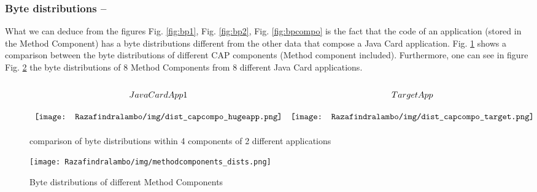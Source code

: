 \subsubsection{Byte distributions --}
What we can deduce from the figures Fig. \ref{fig:bp1}, Fig. \ref{fig:bp2}, Fig.
\ref{fig:bpcompo} is the fact that the code of an application (stored in the Method Component) has a
byte distributions different from the other data that compose a Java Card application. Fig. \ref{fig:bd1} shows a comparison between the byte distributions of different CAP
components (Method component included). Furthermore, one can see in figure Fig. \ref{fig:bd3}
the byte distributions of 8 Method Components from 8 different Java Card applications. 

\begin{figure}[!h]
\begin{center}
\[\arraycolsep=5pt\def\arraystretch{2.1}
\begin{array}{cc}
Java CardApp1 & TargetApp  \\    
\texttt{[image: Razafindralambo/img/dist\_capcompo\_hugeapp.png]} &
\texttt{[image: Razafindralambo/img/dist\_capcompo\_target.png]} 
\end{array}
\]
\caption{comparison of byte distributions within 4 components of 2 different applications}
\label{fig:bd1}
\end{center}
\end{figure}

\begin{figure}[!h]
    \center
    \texttt{[image: Razafindralambo/img/methodcomponents\_dists.png]}
    \caption{Byte distributions of different Method Components}
    \label{fig:bd3}
\end{figure}

 


